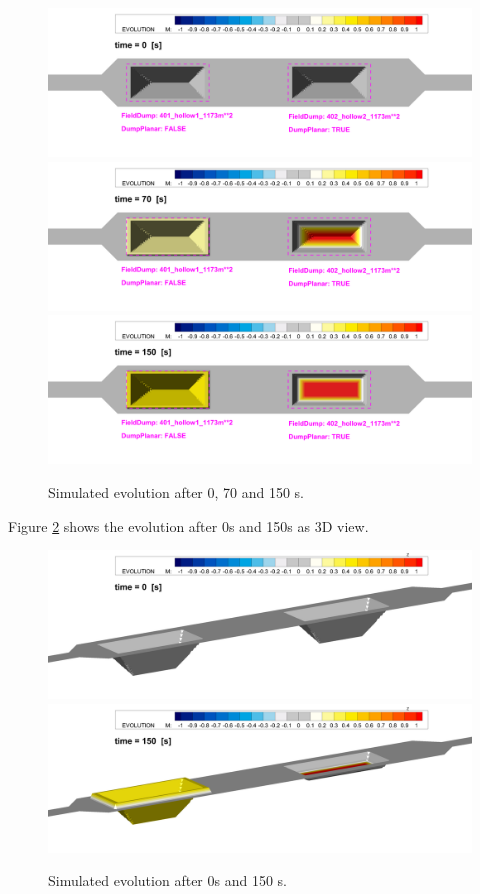 \begin{figure} [!h]
\centering
\includegraphics[scale=0.14]{../img/result000_zoom.png}
\includegraphics[scale=0.14]{../img/result070_zoom.png}
\includegraphics[scale=0.14]{../img/result150_zoom.png}
\caption{Simulated evolution after 0, 70 and 150 s.}\label{result50}
\end{figure}

Figure \ref{result3D} shows the evolution after 0s and 150s as 3D view. 
\begin{figure} [!h]
\centering
\includegraphics[scale=0.14]{../img/result000_zoom3D.png}
\includegraphics[scale=0.14]{../img/result150_zoom3D.png}
\caption{Simulated evolution after 0s and 150 s.}\label{result3D}
\end{figure}


